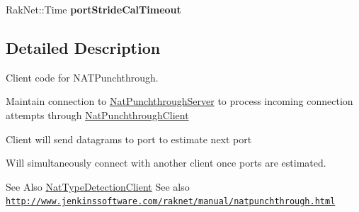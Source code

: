 \begin{DoxyCompactItemize}
\item 
\hypertarget{class_rak_net_1_1_nat_punchthrough_client_ad6e9c1a852d96bad03766aee65f96be0}{Rak\-Net\-::\-Time {\bfseries port\-Stride\-Cal\-Timeout}}\label{class_rak_net_1_1_nat_punchthrough_client_ad6e9c1a852d96bad03766aee65f96be0}

\end{DoxyCompactItemize}


\subsection{Detailed Description}
Client code for N\-A\-T\-Punchthrough. 

Maintain connection to \hyperlink{class_rak_net_1_1_nat_punchthrough_server}{Nat\-Punchthrough\-Server} to process incoming connection attempts through \hyperlink{class_rak_net_1_1_nat_punchthrough_client}{Nat\-Punchthrough\-Client}\par
 Client will send datagrams to port to estimate next port\par
 Will simultaneously connect with another client once ports are estimated. \begin{DoxySeeAlso}{See Also}
\hyperlink{class_rak_net_1_1_nat_type_detection_client}{Nat\-Type\-Detection\-Client} See also \href{http://www.jenkinssoftware.com/raknet/manual/natpunchthrough.html}{\tt http\-://www.\-jenkinssoftware.\-com/raknet/manual/natpunchthrough.\-html} 
\end{DoxySeeAlso}


